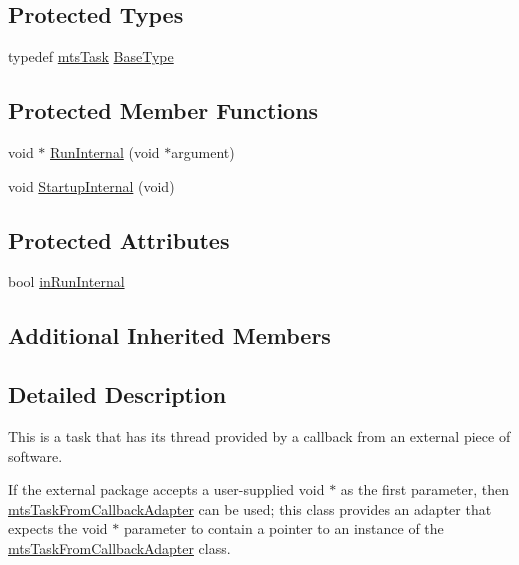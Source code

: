 \subsection*{Protected Types}
\begin{DoxyCompactItemize}
\item 
typedef \hyperlink{classmts_task}{mts\+Task} \hyperlink{classmts_task_from_callback_ab3e56b62478363211e93e97548fcac6f}{Base\+Type}
\end{DoxyCompactItemize}
\subsection*{Protected Member Functions}
\begin{DoxyCompactItemize}
\item 
void $\ast$ \hyperlink{classmts_task_from_callback_a595282bbeeeb168f4f585bee75c92df2}{Run\+Internal} (void $\ast$argument)
\item 
void \hyperlink{classmts_task_from_callback_ae1369f0e11b6d87d833d32548b7caafe}{Startup\+Internal} (void)
\end{DoxyCompactItemize}
\subsection*{Protected Attributes}
\begin{DoxyCompactItemize}
\item 
bool \hyperlink{classmts_task_from_callback_ab39ba4bafd286ab8fffbbee89de845f6}{in\+Run\+Internal}
\end{DoxyCompactItemize}
\subsection*{Additional Inherited Members}


\subsection{Detailed Description}
This is a task that has its thread provided by a callback from an external piece of software.

If the external package accepts a user-\/supplied \textquotesingle{}void $\ast$\textquotesingle{} as the first parameter, then \hyperlink{classmts_task_from_callback_adapter}{mts\+Task\+From\+Callback\+Adapter} can be used; this class provides an adapter that expects the \textquotesingle{}void $\ast$\textquotesingle{} parameter to contain a pointer to an instance of the \hyperlink{classmts_task_from_callback_adapter}{mts\+Task\+From\+Callback\+Adapter} class.

